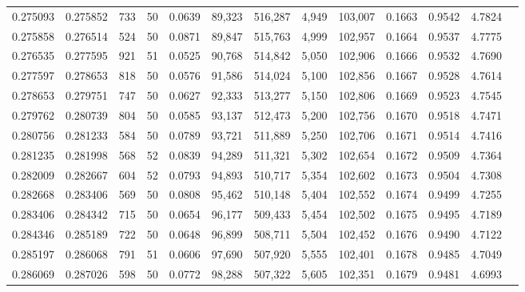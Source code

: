 \begin{tabular}{rrrrrrrrrrrrr}
0.275093 & 0.275852 &   733 &  50 &                                     0.0639 &  89,323 & 516,287 &   4,949 & 103,007 & 0.1663 & 0.9542 & 4.7824 \\
0.275858 & 0.276514 &   524 &  50 &                                     0.0871 &  89,847 & 515,763 &   4,999 & 102,957 & 0.1664 & 0.9537 & 4.7775 \\
0.276535 & 0.277595 &   921 &  51 &                                     0.0525 &  90,768 & 514,842 &   5,050 & 102,906 & 0.1666 & 0.9532 & 4.7690 \\
0.277597 & 0.278653 &   818 &  50 &                                     0.0576 &  91,586 & 514,024 &   5,100 & 102,856 & 0.1667 & 0.9528 & 4.7614 \\
0.278653 & 0.279751 &   747 &  50 &                                     0.0627 &  92,333 & 513,277 &   5,150 & 102,806 & 0.1669 & 0.9523 & 4.7545 \\
0.279762 & 0.280739 &   804 &  50 &                                     0.0585 &  93,137 & 512,473 &   5,200 & 102,756 & 0.1670 & 0.9518 & 4.7471 \\
0.280756 & 0.281233 &   584 &  50 &                                     0.0789 &  93,721 & 511,889 &   5,250 & 102,706 & 0.1671 & 0.9514 & 4.7416 \\
0.281235 & 0.281998 &   568 &  52 &                                     0.0839 &  94,289 & 511,321 &   5,302 & 102,654 & 0.1672 & 0.9509 & 4.7364 \\
0.282009 & 0.282667 &   604 &  52 &                                     0.0793 &  94,893 & 510,717 &   5,354 & 102,602 & 0.1673 & 0.9504 & 4.7308 \\
0.282668 & 0.283406 &   569 &  50 &                                     0.0808 &  95,462 & 510,148 &   5,404 & 102,552 & 0.1674 & 0.9499 & 4.7255 \\
0.283406 & 0.284342 &   715 &  50 &                                     0.0654 &  96,177 & 509,433 &   5,454 & 102,502 & 0.1675 & 0.9495 & 4.7189 \\
0.284346 & 0.285189 &   722 &  50 &                                     0.0648 &  96,899 & 508,711 &   5,504 & 102,452 & 0.1676 & 0.9490 & 4.7122 \\
0.285197 & 0.286068 &   791 &  51 &                                     0.0606 &  97,690 & 507,920 &   5,555 & 102,401 & 0.1678 & 0.9485 & 4.7049 \\
0.286069 & 0.287026 &   598 &  50 &                                     0.0772 &  98,288 & 507,322 &   5,605 & 102,351 & 0.1679 & 0.9481 & 4.6993 \\

\end{tabular}

